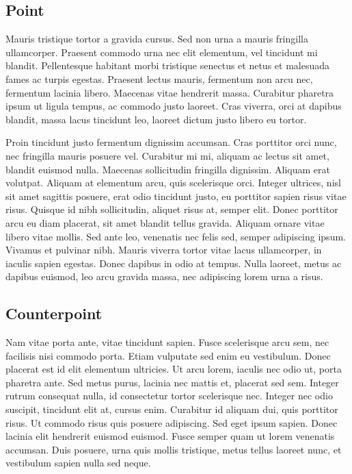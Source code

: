 \documentclass[11pt,a4paper]{memoir}\usepackage[]{graphicx}\usepackage[]{color}
\begin{document}
\subsection{Point}
Mauris tristique tortor a gravida cursus. Sed non urna a mauris fringilla ullamcorper. Praesent commodo urna nec elit elementum, vel tincidunt mi blandit. Pellentesque habitant morbi tristique senectus et netus et malesuada fames ac turpis egestas. Praesent lectus mauris, fermentum non arcu nec, fermentum lacinia libero. Maecenas vitae hendrerit massa. Curabitur pharetra ipsum ut ligula tempus, ac commodo justo laoreet. Cras viverra, orci at dapibus blandit, massa lacus tincidunt leo, laoreet dictum justo libero eu tortor.

Proin tincidunt justo fermentum dignissim accumsan. Cras porttitor orci nunc, nec fringilla mauris posuere vel. Curabitur mi mi, aliquam ac lectus sit amet, blandit euismod nulla. Maecenas sollicitudin fringilla dignissim. Aliquam erat volutpat. Aliquam at elementum arcu, quis scelerisque orci. Integer ultrices, nisl sit amet sagittis posuere, erat odio tincidunt justo, eu porttitor sapien risus vitae risus. Quisque id nibh sollicitudin, aliquet risus at, semper elit. Donec porttitor arcu eu diam placerat, sit amet blandit tellus gravida. Aliquam ornare vitae libero vitae mollis. Sed ante leo, venenatis nec felis sed, semper adipiscing ipsum. Vivamus et pulvinar nibh. Mauris viverra tortor vitae lacus ullamcorper, in iaculis sapien egestas. Donec dapibus in odio at tempus. Nulla laoreet, metus ac dapibus euismod, leo arcu gravida massa, nec adipiscing lorem urna a risus.

\subsection{Counterpoint}
Nam vitae porta ante, vitae tincidunt sapien. Fusce scelerisque arcu sem, nec facilisis nisi commodo porta. Etiam vulputate sed enim eu vestibulum. Donec placerat est id elit elementum ultricies. Ut arcu lorem, iaculis nec odio ut, porta pharetra ante. Sed metus purus, lacinia nec mattis et, placerat sed sem. Integer rutrum consequat nulla, id consectetur tortor scelerisque nec. Integer nec odio suscipit, tincidunt elit at, cursus enim. Curabitur id aliquam dui, quis porttitor risus. Ut commodo risus quis posuere adipiscing. Sed eget ipsum sapien. Donec lacinia elit hendrerit euismod euismod. Fusce semper quam ut lorem venenatis accumsan. Duis posuere, urna quis mollis tristique, metus tellus laoreet nunc, et vestibulum sapien nulla sed neque.
\end{document}
